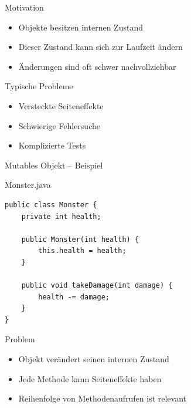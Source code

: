 \begin{frame}{Motivation}
    \begin{itemize}
        \item Objekte besitzen internen Zustand
        \item Dieser Zustand kann sich zur Laufzeit ändern
        \item Änderungen sind oft schwer nachvollziehbar
    \end{itemize}
    \pause
    \begin{alertblock}{Typische Probleme}
        \begin{itemize}
            \item Versteckte Seiteneffekte
            \item Schwierige Fehlersuche
            \item Komplizierte Tests
        \end{itemize}
    \end{alertblock}
\end{frame}

\begin{frame}[fragile]{Mutables Objekt – Beispiel}
    \begin{exampleblock}{Monster.java}
        \begin{lstlisting}
public class Monster {
    private int health;

    public Monster(int health) {
        this.health = health;
    }

    public void takeDamage(int damage) {
        health -= damage;
    }
}
        \end{lstlisting}
    \end{exampleblock}
\end{frame}

\begin{frame}{Problem}
    \begin{itemize}
        \item Objekt verändert seinen internen Zustand
        \item Jede Methode kann Seiteneffekte haben
        \item Reihenfolge von Methodenaufrufen ist relevant
    \end{itemize}
\end{frame}
